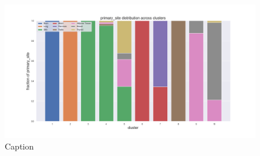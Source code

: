 \begin{figure}[htb!]
    \centering
    \includegraphics[width=0.9\linewidth]{pictures/topic/gtex/oversigma_10tissue/fraction_clustercomposition_l3_primary_site.png}
    \caption{Caption}
    \label{fig:topic/gtex/oversigma_10tissue/fraction_clustercomposition_l2_primary_site}
\end{figure}

